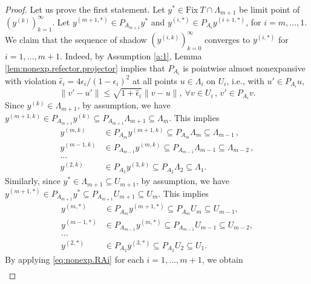 \documentclass[12pt]{article}
\theoremstyle{definition}
\newcommand{\Fix}{\mathrm{Fix}\ }
\begin{document}
\begin{proof}
Let us prove the first statement.
Let $y^*\in\Fix T\cap\Lambda_{m+1}$ be limit point of $(y^{(k)})_{k=1}^\infty$.
Let $y^{(m+1,*)}\in P_{A_{m+1}} y^*$ and $y^{(i,*)}\in P_{A_i} y^{(i+1,*)}$, for $i=m,\dots,1$.
We claim that the sequence of shadow $(y^{(i,k)})_{k=0}^\infty$ converges to $y^{(i,*)}$ for $i=1,\dots,m+1$.
Indeed, by Assumption \ref{a:1},
Lemma \ref{lem:nonexp.refector.projector} implies that $P_{A_i}$ is pointwise almost
nonexpansive with violation $\hat \epsilon_i= 4\epsilon_i/(1-\epsilon_i)^2$
at all points
$u\in \Lambda_i$ on $U_i$, i.e., with $u'\in P_{A_i}u$,
\begin{equation}\label{eq:nonexp.RAi}
    \|v'-u'\|\leq \sqrt{1+\hat\epsilon_i}\|v-u\|, \ \forall v\in U_i\,,\, v'\in P_{A_i}v.
\end{equation}
Since $y^{(k)}\in\Lambda_{m+1}$, by assumption, we have $y^{(m+1,k)}\in P_{A_{m+1}}y^{(k)}\subseteq P_{A_{m+1}}\Lambda_{m+1}\subseteq\Lambda_m$. This implies 
\begin{equation}
\begin{array}{rl}
     y^{(m,k)}&\in P_{A_m}y^{(m+1,k)} \subseteq P_{A_m}\Lambda_{m}\subseteq  \Lambda_{m-1}\, ,\\
     y^{(m-1,k)}&\in  P_{A_{m-1}}y^{(m,k)} \subseteq P_{A_{m-1}}\Lambda_{m-1}\subseteq \Lambda_{m-2}\, ,\\
     \dots \\
     y^{(2,k)}&\in  P_{A_2}y^{(3,k)} \subseteq P_{A_2}\Lambda_2\subseteq \Lambda_{1}.
\end{array}
\end{equation}
Similarly, since $y^*\in\Lambda_{m+1}\subseteq U_{m+1}$, by assumption, we have $y^{(m+1,*)}\in P_{A_{m+1}}y^*\subseteq P_{A_{m+1}}U_{m+1}\subseteq U_m$. This implies
\begin{equation}
\begin{array}{rl}
     y^{(m,*)}&\in P_{A_m}y^{(m+1,*)} \subseteq P_{A_m}U_{m}\subseteq  U_{m-1}, \\
     y^{(m-1,*)}&\in  P_{A_{m-1}}y^{(m,*)} \subseteq P_{A_{m-1}}U_{m-1}\subseteq U_{m-2},\\
     \dots \\
     y^{(2,*)}&\in  P_{A_2}y^{(3,*)} \subseteq P_{A_2}U_2\subseteq U_{1}.
\end{array}
\end{equation}
By applying \eqref{eq:nonexp.RAi} for each $i=1,\dots,m+1$, we obtain
\begin{equation}
    \begin{array}{rl}

\end{array}
\end{equation}
\end{proof}
\end{document}
